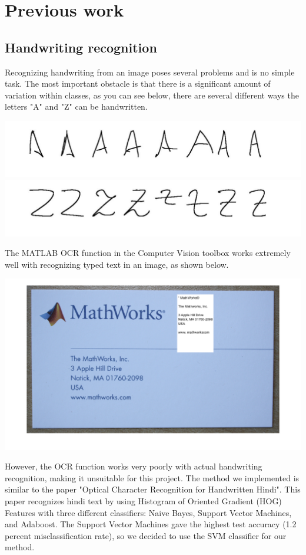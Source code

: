 \documentclass{article} %
\begin{document}
\section{Previous work}
\subsection{Handwriting recognition} %
Recognizing handwriting from an image poses several problems and is no simple task. The most important obstacle is that there is a significant amount of variation within classes, as you can see below, there are several different ways the letters "A" and "Z" can be handwritten.
\begin{center}
\includegraphics[scale = 0.25]{A.jpg}
\includegraphics[scale = 0.25]{Z.jpg}
\end{center}
The MATLAB OCR function in the Computer Vision toolbox works extremely well with recognizing typed text in an image, as shown below.
\begin{center}
\includegraphics[scale = 0.4]{RecognizeTextWithinAnImageExample_01.png}
\end{center}
However, the OCR function works very poorly with actual handwriting recognition, making it unsuitable for this project. The method we implemented is similar to the paper "Optical Character Recognition for Handwritten Hindi". This paper recognizes hindi text by using Histogram of Oriented Gradient (HOG) Features with three different classifiers: Naive Bayes, Support Vector Machines, and Adaboost. The Support Vector Machines gave the highest test accuracy (1.2 percent misclassification rate), so we decided to use the SVM classifier for our method.
\end{document}
